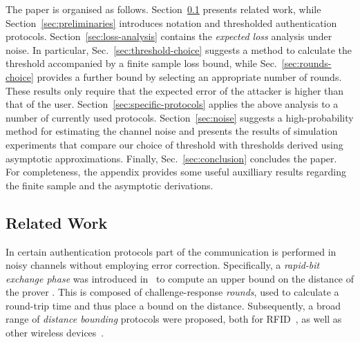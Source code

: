 \documentclass[a4paper]{article}
\theoremstyle{plain} \newtheorem{remark}{Remark}
\theoremstyle{plain} \newtheorem{definition}{Definition}
\theoremstyle{plain} \newtheorem{example}{Example}
\theoremstyle{plain} \newtheorem{assumption}{Assumption}
\theoremstyle{plain} \newtheorem{conjecture}{Conjecture}
\theoremstyle{plain} \newtheorem{theorem}{Theorem}
\theoremstyle{plain} \newtheorem{proposition}{Proposition}
\theoremstyle{plain} \newtheorem{lemma}{Lemma}
\theoremstyle{plain} \newtheorem{corollary}{Corollary}
\begin{document}
The paper is organised as follows. Section~\ref{sec:relatedwork}
presents related work, while Section~\ref{sec:preliminaries}
introduces notation and thresholded authentication
protocols. Section~\ref{sec:loss-analysis} contains the
\textit{expected loss} analysis under noise. In particular,
Sec.~\ref{sec:threshold-choice} suggests a method to calculate the
threshold accompanied by a finite sample loss bound, while
Sec.~\ref{sec:rounds-choice} provides a further bound by selecting an
appropriate number of rounds. These results only require that the
expected error of the attacker is higher than that of the
user. Section~\ref{sec:specific-protocols} applies the above analysis
to a number of currently used protocols.  Section~\ref{sec:noise}
suggests a high-probability method for estimating the channel noise
and presents the results of simulation experiments that compare our
choice of threshold with thresholds derived using asymptotic
approximations. Finally, Sec.~\ref{sec:conclusion} concludes the
paper. For completeness, the appendix provides some useful auxilliary
results regarding the finite sample and the asymptotic derivations.

\subsection{Related Work}
\label{sec:relatedwork}
In certain authentication protocols part of the communication is
performed in noisy channels without employing error correction.
Specifically, a {\em rapid-bit exchange phase} was introduced
in~\cite{brands94} to compute an upper bound on the distance of the
prover .  This is composed of  challenge-response
\textit{rounds}, used to calculate a round-trip time and thus place a
bound on the distance.  Subsequently, a broad range of
\textit{distance bounding} protocols were proposed, both for
RFID~\cite{hancke05, KimAKSP-2008-icisc, reid2007, singelee1,
  sheddingLight}, as well as other wireless devices~\cite{capkun,
  capkun2, tippenhauer}.
\end{document}
